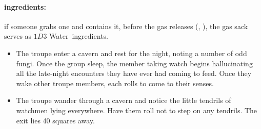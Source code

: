 \begin{multicols}{2}
\paragraph{\Glspl{ingredient}:}
if someone grabs one and contains it, before the gas releases (, \tn[10]), the gas sack serves as $1D3$ Water~\glspl{ingredient}.


\begin{itemize}
  \item
  The troupe enter a cavern and rest for the night, noting a number of odd fungi.
  Once the group sleep, the member taking watch begins hallucinating all the late-night encounters they have ever had coming to feed.
  Once they wake other troupe members, each rolls to come to their senses.
  \item
  The troupe wander through a cavern and notice the little tendrils of watchmen lying everywhere.
  Have them roll  not to step on any tendrils.
  The exit lies 40 squares away.

\end{itemize}

\end{multicols}

